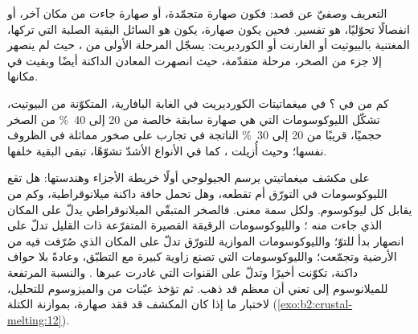 التعريف وصفيّ عن قصد: فكون  صهارة متجمّدة، أو صهارة
جاءت من مكان آخر، أو انفصالًا تحوّليًا، هو تفسير. فحين يكون
صهارة، يكون  هو السائل  البقية الصلبة التي تركها، المغتنية
بالبيوتيت أو الغارنت أو الكورديريت:  يسجّل المرحلة الأولى من ، حيث
لم ينصهر إلا جزء من الصخر،  مرحلة متقدّمة، حيث انصهرت المعادن الداكنة
أيضًا وبقيت  في مكانها.

كم من  في ؟ في ميغماتيتات الكورديريت في الغابة البافارية،
المتكوّنة  من البيوتيت، تشكّل الليوكوسومات التي هي صهارة سابقة خالصة من 20 إلى
\qty{40}{\percent} من الصخر حجميًا، قريبًا من 20 إلى \qty{30}{\percent} الناتجة في
تجارب  على صخور مماثلة في الظروف نفسها؛ وحيث
أُزيلت ، كما في الأنواع الأشدّ تشوّهًا، تبقى البقية خلفها.

\begin{inthefield}
على مكشف ميغماتيتي يرسم الجيولوجي أولًا خريطة الأجزاء وهندستها: هل تقع
الليوكوسومات في التورّق أم تقطعه، وهل تحمل حافة داكنة ميلانوقراطية،
وكم من  يقابل كل ليوكوسوم. ولكل سمة معنى. فالصخر المتبقّي
الميلانوقراطي يدلّ على المكان الذي جاءت منه ؛ والليوكوسومات الرقيقة القصيرة المتفرّعة ذات
 القليل تدلّ على انصهار بدأ للتوّ؛ والليوكوسومات الموازية للتورّق
تدلّ على المكان الذي صُرّفت فيه  من الأرضية وتجمّعت؛ والليوكوسومات التي تصنع زاوية كبيرة مع
التطبّق، وعادةً بلا حواف داكنة، تكوّنت أخيرًا وتدلّ على القنوات التي
غادرت عبرها . والنسبة المرتفعة للميلانوسوم إلى  تعني أن معظم  قد ذهب.
ثم تؤخذ عيّنات من   والميزوسوم للتحليل، لاختبار ما إذا كان المكشف
قد فقد صهارة، بموازنة الكتلة (\cref{exo:b2:crustal-melting:12}).
\end{inthefield}

